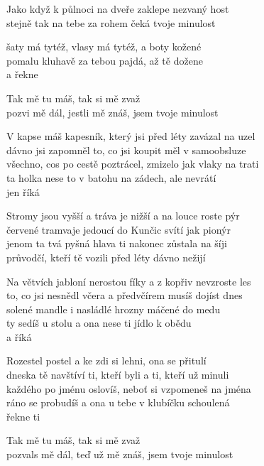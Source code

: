 

\ve{}
Jako když k půlnoci na dveře zaklepe nezvaný host\\
stejně tak na tebe za rohem čeká tvoje minulost

šaty má tytéž, vlasy má tytéž, a boty kožené\\
pomalu kluhavě za tebou pajdá, až tě dožene\\
a řekne

\cho{}
Tak mě tu máš, tak si mě zvaž\\
pozvi mě dál, jestli mě znáš, jsem tvoje minulost

\ve{}
V kapse máš kapesník, který jsi před léty zavázal na uzel\\
dávno jsi zapomněl to, co jsi koupit měl v samoobsluze\\
všechno, cos po cestě poztrácel, zmizelo jak vlaky na trati\\
ta holka nese to v batohu na zádech, ale nevrátí\\
jen říká

\cho{}

\ve{}
Stromy jsou vyšší a tráva je nižší a na louce roste pýr\\
červené tramvaje jedoucí do Kunčic svítí jak pionýr\\
jenom ta tvá pyšná hlava ti nakonec zůstala na šíji\\
průvodčí, kteří tě vozili před léty dávno nežijí

\cho{}

\ve{}
Na větvích jabloní nerostou fíky a z kopřiv nevzroste les\\
to, co jsi nesnědl včera a předvčírem musíš dojíst dnes\\
solené mandle i nasládlé hrozny máčené do medu\\
ty sedíš u stolu a ona nese ti jídlo k obědu\\
a říká

\cho{}

\ve{}
Rozestel postel a ke zdi si lehni, ona se přitulí\\
dneska tě navštíví ti, kteří byli a ti, kteří už minuli\\
každého po jménu oslovíš, neboť si vzpomeneš na jména\\
ráno se probudíš a ona u tebe v klubíčku schoulená\\
řekne ti

\cho{}
Tak mě tu máš, tak si mě zvaž\\
pozvals mě dál, teď už mě znáš, jsem tvoje minulost

\esong
\restoregeometry{}